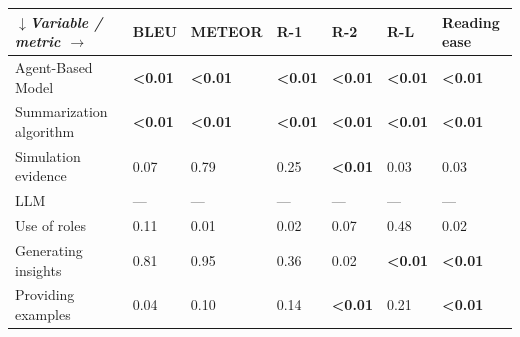 \begin{tabular}{|l|l|l|l|l|l|l|}
\hline
\textit{$\downarrow$Variable / metric $\rightarrow$} & BLEU & METEOR & R-1 & R-2 & R-L & Reading ease \\
 \hline
 Agent-Based Model & \textbf{\textless{}0.01} & \textbf{\textless{}0.01} & \textbf{\textless{}0.01} & \textbf{\textless{}0.01} & \textbf{\textless{}0.01} & \textbf{\textless{}0.01} \\
 \hline
 Summarization algorithm & \textbf{\textless{}0.01} & \textbf{\textless{}0.01} & \textbf{\textless{}0.01} & \textbf{\textless{}0.01} & \textbf{\textless{}0.01} & \textbf{\textless{}0.01} \\
 \hline
 Simulation evidence & 0.07 & 0.79 & 0.25 & \textbf{\textless{}0.01} & 0.03 & 0.03 \\
 \hline
 LLM & — & — & — & — & — & — \\
 \hline
 Use of roles & 0.11 & 0.01 & 0.02 & 0.07 & 0.48 & 0.02 \\
 \hline
 Generating insights & 0.81 & 0.95 & 0.36 & 0.02 & \textbf{\textless{}0.01} & \textbf{\textless{}0.01} \\
 \hline
 Providing examples & 0.04 & 0.10 & 0.14 & \textbf{\textless{}0.01} & 0.21 & \textbf{\textless{}0.01} \\
\hline
\end{tabular}

